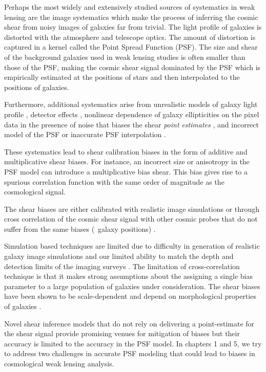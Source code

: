 Perhaps the most widely and extensively studied sources of systematics in weak lensing are the image systematics which make 
the process of inferring the cosmic shear from noisy images of galaxies far from trivial. The light profile of 
galaxies is distorted with the atmosphere and telescope optics. The amount of distortion is captured in a kernel called 
the Point Spread Function (PSF). The size and shear of the background galaxies used in weak lensing studies is often 
smaller than those of the PSF, making the cosmic shear signal dominated by the PSF which is empirically estimated at 
the positions of stars and then interpolated to the positions of galaxies.  

Furthermore, additional systematics arise from unrealistic models of galaxy light profile \citep{voight2010,im3shape,kac2014}, 
detector effects \citep{arun2016,jaya2016,plazas2016}, nonlinear dependence of galaxy ellipticities 
on the pixel data in the presence of noise that biases the shear \emph{point} \emph{estimates} \citep{melchoir,great3,conti2017}, 
and incorrect model of the PSF or inaccurate PSF interpolation \citep{rowe2010,kuijken2015,great3,des}.

These systematics lead to shear calibration biases in the form of additive and multiplicative 
shear biases. For instance, an incorrect size or anisotropy in the PSF model can introduce 
a multiplicative bias shear. This bias gives rise to a spurious correlation function with the 
same order of magnitude as the cosmological signal.

The shear biases are either calibrated with realistic image simulations \citep{im3shape,jee2016,conti2017} or through cross correlation of 
the cosmic shear signal with other cosmic probes that do not suffer from the same biases (\eg\ galaxy positions)
\citep{liu2016,schann,singh2017}. 

Simulation based techniques are limited due to difficulty in 
generation of realistic galaxy image simulations \citep{great3,lanus2017} and our limited ability to match the depth and detection limits of 
the imaging surveys \citep{hoekstra}. The limitation of cross-correlation technique is that it makes strong assumptions about the assigning a 
single bias parameter to a large population of galaxies under consideration. The shear biases have been shown to be scale-dependent \citep{des,jee2016} 
and depend on morphological properties of galaxies \citep{im3shape,conti2017}. 

Novel shear inference models that do not rely on delivering a point-estimate for the shear signal \citep{schneider,bernstein,huff,sheldon} 
provide promising venues for mitigation of biases but their accuracy is limited to the accuracy in the PSF model.
In chapters 1 and 5, we try to address two challenges in accurate PSF modeling that could lead to biases in cosmological weak lensing analysis. 


